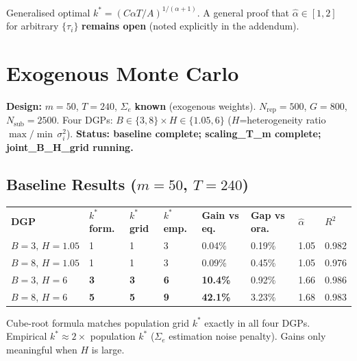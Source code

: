 \documentclass[11pt,a4paper]{article}
\newcommand{\ck}[1]{\textcolor{mygreen}{\textbf{#1}}}
\newcommand{\kstar}{k^*}
\newcommand{\ahat}{\hat{\alpha}}
\newcommand{\Sige}{\Sigma_e}
\begin{document}
\smallskip\noindent
Generalised optimal \(\kstar = (C\alpha T/A)^{1/(\alpha+1)}\).
A general proof that \(\ahat\in[1,2]\) for arbitrary \(\{\tau_i\}\) \textbf{remains open}
(noted explicitly in the addendum).

\section{Exogenous Monte Carlo}

\noindent\textbf{Design:} \(m=50\), \(T=240\), \(\Sige\) \textbf{known} (exogenous weights).
\(N_{\mathrm{rep}}=500\), \(G=800\), \(N_{\mathrm{sub}}=2500\).
Four DGPs: \(B\in\{3,8\}\times H\in\{1.05,6\}\)
(\(H\)=heterogeneity ratio \(\max/\min\,\sigma_i^2\)).
\textbf{Status: baseline complete; scaling\_T\_m complete; joint\_B\_H\_grid running.}

\subsection{Baseline Results (\(m=50\), \(T=240\))}

\smallskip
\begin{tabular}{L{2.2cm} C{1.1cm} C{1.0cm} C{1.2cm} C{1.3cm} C{1.3cm} C{0.9cm} C{0.9cm}}
\color{white}\bfseries DGP &
\color{white}\bfseries \(\kstar\) form. &
\color{white}\bfseries \(\kstar\) grid &
\color{white}\bfseries \(\kstar\) emp. &
\color{white}\bfseries Gain vs eq. &
\color{white}\bfseries Gap vs ora. &
\color{white}\bfseries \(\ahat\) &
\color{white}\bfseries \(R^2\) \\
\(B{=}3,\,H{=}1.05\) & 1 & 1 & \textcolor{myamber}{3} & 0.04\% & 0.19\% & 1.05 & 0.982 \\
\(B{=}8,\,H{=}1.05\) & 1 & 1 & \textcolor{myamber}{3} & 0.09\% & 0.45\% & 1.05 & 0.976 \\
\(B{=}3,\,H{=}6\)   & \ck{3} & \ck{3} & \ck{6} & \ck{10.4\%} & 0.92\% & 1.66 & 0.986 \\
\(B{=}8,\,H{=}6\)   & \ck{5} & \ck{5} & \ck{9} & \ck{42.1\%} & 3.23\% & 1.68 & 0.983 \\
\end{tabular}

\smallskip\noindent
{\small\color{dgrey}
Cube-root formula matches population grid \(\kstar\) exactly in all four DGPs.
Empirical \(\kstar\approx 2\times\) population \(\kstar\) (\(\Sige\) estimation noise penalty).
Gains only meaningful when \(H\) is large.}
\end{document}
